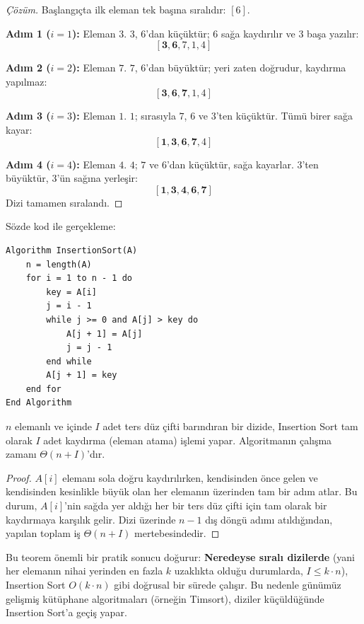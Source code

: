 \begin{proof}[Çözüm]
Başlangıçta ilk eleman tek başına sıralıdır: $[6]$.

\textbf{Adım 1 ($i=1$):} Eleman $3$.
$3$, $6$'dan küçüktür; $6$ sağa kaydırılır ve $3$ başa yazılır:
\[
[ \mathbf{3, 6}, 7, 1, 4 ]
\]

\textbf{Adım 2 ($i=2$):} Eleman $7$.
$7$, $6$'dan büyüktür; yeri zaten doğrudur, kaydırma yapılmaz:
\[
[ \mathbf{3, 6, 7}, 1, 4 ]
\]

\textbf{Adım 3 ($i=3$):} Eleman $1$.
$1$; sırasıyla $7$, $6$ ve $3$'ten küçüktür. Tümü birer sağa kayar:
\[
[ \mathbf{1, 3, 6, 7}, 4 ]
\]

\textbf{Adım 4 ($i=4$):} Eleman $4$.
$4$; $7$ ve $6$'dan küçüktür, sağa kayarlar. $3$'ten büyüktür, $3$'ün sağına yerleşir:
\[
[ \mathbf{1, 3, 4, 6, 7} ]
\]
Dizi tamamen sıralandı.
\end{proof}

Sözde kod ile gerçekleme:
\begin{lstlisting}
Algorithm InsertionSort(A)
    n = length(A)
    for i = 1 to n - 1 do
        key = A[i]
        j = i - 1
        while j >= 0 and A[j] > key do
            A[j + 1] = A[j]
            j = j - 1
        end while
        A[j + 1] = key
    end for
End Algorithm\end{lstlisting}

\begin{theorem}
$n$ elemanlı ve içinde $I$ adet ters düz çifti barındıran bir dizide, Insertion Sort tam olarak $I$ adet kaydırma (eleman atama) işlemi yapar. Algoritmanın çalışma zamanı $\Theta(n + I)$'dır.
\end{theorem}

\begin{proof}
$A[i]$ elemanı sola doğru kaydırılırken, kendisinden önce gelen ve kendisinden kesinlikle büyük olan her elemanın üzerinden tam bir adım atlar. Bu durum, $A[i]$'nin sağda yer aldığı her bir ters düz çifti için tam olarak bir kaydırmaya karşılık gelir. Dizi üzerinde $n-1$ dış döngü adımı atıldığından, yapılan toplam iş $\Theta(n + I)$ mertebesindedir.
\end{proof}

Bu teorem önemli bir pratik sonucu doğurur: \textbf{Neredeyse sıralı dizilerde} (yani her elemanın nihai yerinden en fazla $k$ uzaklıkta olduğu durumlarda, $I \le k \cdot n$), Insertion Sort $O(k \cdot n)$ gibi doğrusal bir sürede çalışır. Bu nedenle günümüz gelişmiş kütüphane algoritmaları (örneğin Timsort), diziler küçüldüğünde Insertion Sort'a geçiş yapar.

